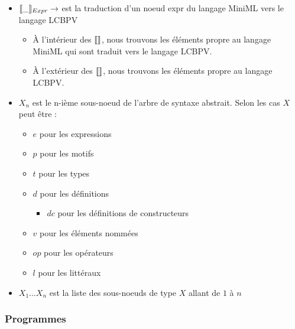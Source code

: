 \documentclass[12pt]{article}
\begin{document}
\begin{itemize}
      \tightlist
      \item
            $\llbracket \_ \rrbracket_{Expr}  \rightarrow $ est la traduction d'un noeud expr du langage MiniML vers le langage LCBPV
            \begin{itemize}
                  \tightlist
                  \item
                        À l'intérieur des $\llbracket  \rrbracket$, nous trouvons les éléments propre au langage MiniML qui sont traduit vers le langage LCBPV.
                  \item
                        À l'extérieur des $\llbracket  \rrbracket$, nous trouvons les éléments propre au langage LCBPV.
            \end{itemize}
      \item
            $X_n$ est le n-ième sous-noeud de l'arbre de syntaxe abstrait. \newline
            Selon les cas $X$ peut être :
            \begin{itemize}
                  \tightlist
                  \item
                        $e$ pour les expressions
                  \item
                        $p$ pour les motifs
                  \item
                        $t$ pour les types
                  \item
                        $d$ pour les définitions
                        \begin{itemize}
                              \tightlist
                              \item
                                    $dc$ pour les définitions de constructeurs
                        \end{itemize}
                  \item
                        $v$ pour les éléments nommées
                  \item
                        $op$ pour les opérateurs
                  \item
                        $l$ pour les littéraux
            \end{itemize}
      \item
            $X_1 \dots X_n$ est la liste des sous-noeuds de type $X$ allant de $1$ à $n$
\end{itemize}


\hypertarget{programmes-1}{%
      \subsubsection*{Programmes}\label{programmes-1}}
\end{document}
